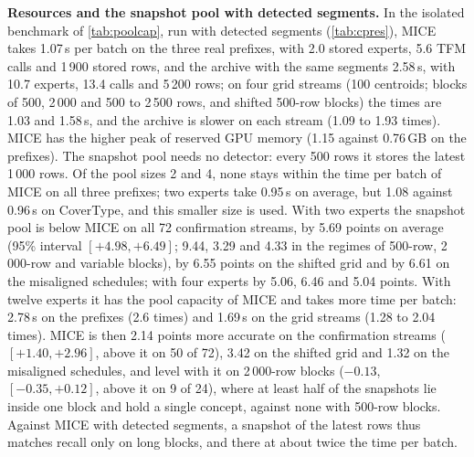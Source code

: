 \documentclass[11pt]{article}
\theoremstyle{plain}
\theoremstyle{definition}
\theoremstyle{remark}
\newcommand{\method}{\textsc{MICE}}   %
\begin{document}
\textbf{Resources and the snapshot pool with detected segments.} In the isolated benchmark of \cref{tab:poolcap},
run with detected segments (\cref{tab:cpres}), \method{} takes 1.07\,s per batch on the three real prefixes, with
2.0 stored experts, 5.6 TFM calls and 1\,900 stored rows, and the archive with the same segments 2.58\,s, with 10.7
experts, 13.4 calls and 5\,200 rows; on four grid streams (100 centroids; blocks of 500, 2\,000 and 500 to
2\,500 rows, and shifted 500-row blocks) the times are 1.03 and 1.58\,s, and the archive is slower on each stream
(1.09 to 1.93 times). \method{} has the higher peak of reserved GPU memory (1.15 against 0.76\,GB on the prefixes).
The snapshot pool needs no detector: every 500 rows it stores the latest 1\,000 rows. Of the pool sizes 2 and 4, none
stays within the time per batch of \method{} on all three prefixes; two experts take 0.95\,s on average, but 1.08
against 0.96\,s on CoverType, and this smaller size is used. With two experts the snapshot pool is below \method{}
on all 72 confirmation streams, by 5.69 points on average (95\% interval $[+4.98,+6.49]$; 9.44, 3.29 and 4.33 in the
regimes of 500-row, 2\,000-row and variable blocks), by 6.55 points on the shifted grid and by 6.61 on the misaligned
schedules; with four experts by 5.06, 6.46 and 5.04 points. With twelve experts it has the pool capacity of
\method{} and takes more time per batch: 2.78\,s on the prefixes (2.6 times) and 1.69\,s on the grid streams (1.28 to
2.04 times). \method{} is then 2.14 points more accurate on the confirmation streams ($[+1.40,+2.96]$, above it on 50
of 72), 3.42 on the shifted grid and 1.32 on the misaligned schedules, and level with it on 2\,000-row blocks
($-0.13$, $[-0.35,+0.12]$, above it on 9 of 24), where at least half of the snapshots lie inside one block and hold a
single concept, against none with 500-row blocks. Against \method{} with detected segments, a snapshot of the latest
rows thus matches recall only on long blocks, and there at about twice the time per batch.
\end{document}
